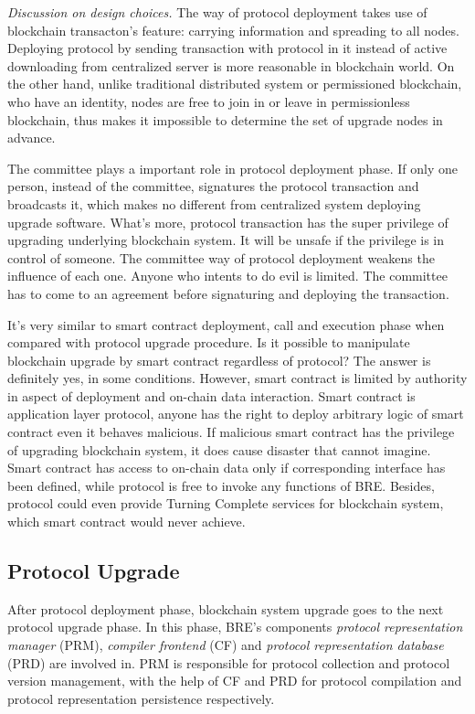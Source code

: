\documentclass[sigplan,screen]{acmart}
\begin{document}
\textit{Discussion on design choices.} The way of protocol deployment takes use
of blockchain transacton's feature: carrying information and spreading to all
nodes. Deploying protocol by sending transaction with protocol in it instead of
active downloading from centralized server is more reasonable in blockchain
world. On the other hand, unlike traditional distributed system or permissioned
blockchain, who have an identity, nodes are free to join in or leave in
permissionless blockchain, thus makes it impossible to determine the set of
upgrade nodes in advance.

The committee plays a important role in protocol deployment phase. If only one
person, instead of the committee, signatures the protocol transaction
and broadcasts it, which makes no different from centralized system deploying
upgrade software. What's more, protocol transaction has the super
privilege of upgrading underlying blockchain system. It will be unsafe if the
privilege is in control of someone. The committee way of protocol deployment
weakens the influence of each one. Anyone who intents to do evil is limited.
The committee has to come to an agreement before signaturing and deploying the
transaction.

It's very similar to smart contract
deployment, call and execution phase when compared with protocol upgrade
procedure. Is it possible to manipulate blockchain upgrade by smart contract
regardless of protocol? The answer is definitely yes, in some conditions.
However, smart contract is limited by authority in aspect of deployment and
on-chain data interaction. Smart contract is application layer protocol,
anyone has the right to deploy arbitrary logic of smart contract even
it behaves malicious. If malicious smart contract has the privilege of
upgrading blockchain system, it does cause disaster that cannot imagine.
Smart contract has access to on-chain data only if corresponding
interface has been defined,
while protocol is free to invoke any functions of BRE. Besides,
protocol could even provide Turning Complete services for blockchain system,
which smart contract would never achieve.


\subsection{Protocol Upgrade}
After protocol deployment phase, blockchain system upgrade goes to the next
protocol upgrade phase. In this phase, BRE's components \textit{protocol
  representation manager} (PRM), \textit{compiler frontend} (CF) and
\textit{protocol representation database} (PRD) are involved in. PRM is responsible
for protocol collection and protocol version management, with the help of CF
and PRD for protocol compilation and protocol representation persistence
respectively.
\end{document}
